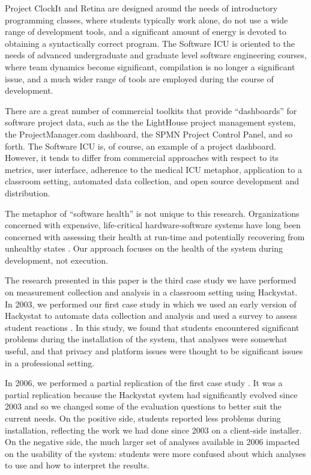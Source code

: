 \documentclass{acm_proc_article-sp}
\begin{document}
Project ClockIt and Retina are designed around the needs of introductory
programming classes, where students typically work alone, do not use a wide
range of development tools, and a significant amount of energy is devoted
to obtaining a syntactically correct program.  The Software ICU is oriented
to the needs of advanced undergraduate and graduate level software
engineering courses, where team dynamics become significant, compilation is
no longer a significant issue, and a much wider range of tools are employed 
during the course of development.  

There are a great number of commercial toolkits that provide ``dashboards''
for software project data, such as the the LightHouse project management
system, the ProjectManager.com dashboard, the SPMN Project Control Panel,
and so forth. The Software ICU is, of course, an example of a project
dashboard. However, it tends to differ from commercial approaches with
respect to its metrics, user interface, adherence to the medical ICU
metaphor, application to a classroom setting, automated data
collection, and open source development and distribution. 

The metaphor of ``software health'' is not unique to this research.
Organizations concerned with expensive, life-critical hardware-software
systems have long been concerned with assessing their health at run-time
and potentially recovering from unhealthy states \cite{Hadden00,
Thai01}. Our approach focuses on the health of the system during
development, not execution.

The research presented in this paper is the third case study we have
performed on measurement collection and analysis in a classroom setting
using Hackystat.  In 2003, we performed our first case study in which we used an
early version of Hackystat to automate data collection and analysis and
used a survey to assess student reactions \cite{csdl2-03-12}.  In this
study, we found that students encountered significant problems during the
installation of the system, that analyses were somewhat useful, and that
privacy and platform issues were thought to be significant issues in a
professional setting.

In 2006, we performed a partial replication of the first case study \cite{csdl2-07-02}.  It
was a partial replication because the Hackystat system had significantly
evolved since 2003 and so we changed some of the evaluation questions to
better suit the current needs.  On the positive side, students reported
less problems during installation, reflecting the work we had done since
2003 on a client-side installer.  On the negative side, the much larger set
of analyses available in 2006 impacted on the usability of the system:
students were more confused about which analyses to use and how to
interpret the results.
\end{document}
